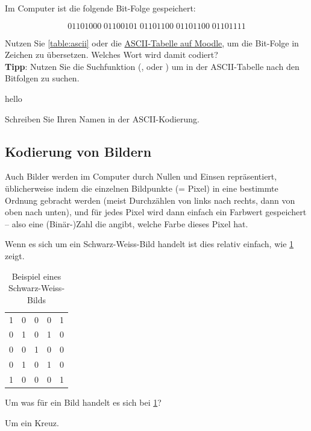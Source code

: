 \begin{myexercise}
Im Computer ist die folgende Bit-Folge gespeichert:

\[01101000\; 01100101\; 01101100\; 01101100\; 01101111\]

Nutzen Sie \cref{table:ascii} oder die \href{https://moodle.ksimlee.ch/pluginfile.php/55979/mod_resource/content/1/ASCII_table.pdf}{\gls{ASCII}-Tabelle auf Moodle}, um die Bit-Folge in Zeichen zu übersetzen. Welches Wort wird damit codiert?\\

\textbf{Tipp}: Nutzen Sie die Suchfunktion (, oder ) um in der ASCII-Tabelle nach den Bitfolgen zu suchen.
\begin{myanswer}
hello
\end{myanswer}
\end{myexercise}

\begin{myexercise}
Schreiben Sie Ihren Namen in der \gls{ASCII}-Kodierung.
\end{myexercise}

\subsection{Kodierung von Bildern}

Auch Bilder werden im Computer durch Nullen und Einsen repräsentiert, üblicherweise indem die einzelnen Bildpunkte (= Pixel) in eine bestimmte Ordnung gebracht werden (meist Durchzählen von links nach rechts, dann von oben nach unten), und für jedes Pixel wird dann einfach ein Farbwert gespeichert – also eine (Binär-)Zahl die angibt, welche Farbe dieses Pixel hat. 

Wenn es sich um ein Schwarz-Weiss-Bild handelt ist dies relativ einfach, wie \cref{table:bw-img} zeigt.

\begin{table}[H]
\centering
\begin{tabular}{lllll}
1 & 0 & 0 & 0 & 1 \\
0 & 1 & 0 & 1 & 0 \\
0 & 0 & 1 & 0 & 0 \\
0 & 1 & 0 & 1 & 0 \\
1 & 0 & 0 & 0 & 1
\end{tabular}
\caption{Beispiel eines Schwarz-Weiss-Bilds}
\label{table:bw-img}
\end{table}

\begin{myexercise}
Um was für ein Bild handelt es sich bei \cref{table:bw-img}?
\begin{myanswer}
Um ein Kreuz.
\end{myanswer}
\end{myexercise}

